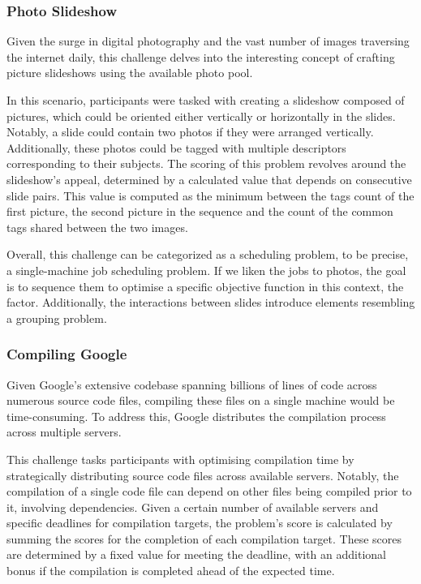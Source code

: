 \subsubsection*{Photo Slideshow}
\label{subsubsec:hashcode-2019-qualification}

Given the surge in digital photography and the vast number of images traversing
the internet daily, this challenge delves into the interesting concept of crafting
picture slideshows using the available photo pool.

In this scenario, participants were tasked with creating a slideshow composed of
pictures, which could be oriented either vertically or horizontally in the
slides. Notably, a slide could contain two photos if they were arranged
vertically. Additionally, these photos could be tagged with multiple descriptors
corresponding to their subjects. The scoring of this problem revolves around the
slideshow's appeal, determined by a calculated value that depends on consecutive
slide pairs. This value is computed as the minimum between the tags count of the
first picture, the second picture in the sequence and the count of the common
tags shared between the two images.

Overall, this challenge can be categorized as a scheduling problem, to be
precise, a single-machine job scheduling problem. If we liken the jobs to
photos, the goal is to sequence them to optimise a specific objective function
in this context, the~ factor. Additionally, the interactions
between slides introduce elements resembling a grouping problem.

\subsubsection*{Compiling Google}
\label{subsubsec:hashcode-2019-final}

Given Google's extensive codebase spanning billions of lines of code across
numerous source code files, compiling these files on a single machine would be
time-consuming. To address this, Google distributes the compilation process
across multiple servers.

This challenge tasks participants with optimising compilation time by
strategically distributing source code files across available servers. Notably,
the compilation of a single code file can depend on other files being compiled
prior to it, involving dependencies. Given a certain number of available servers
and specific deadlines for compilation targets, the problem's score is
calculated by summing the scores for the completion of each compilation target.
These scores are determined by a fixed value for meeting the deadline, with an
additional bonus if the compilation is completed ahead of the expected time.

